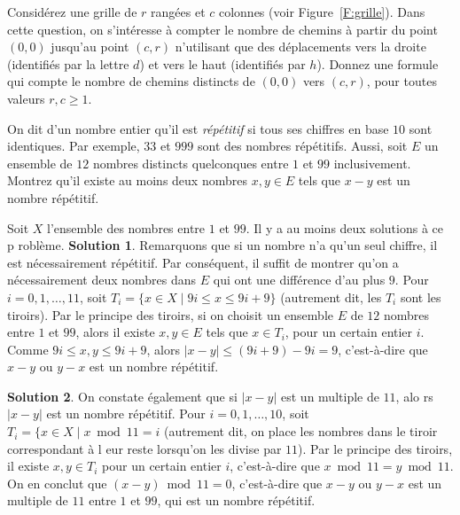 \documentclass[12pt,addpoints]{exam}
\begin{document}
\begin{questions}
\question
Considérez une grille de $r$ rangées et $c$ colonnes (voir Figure~\ref{F:grille}). Dans cette question, on s'intéresse à compter le nombre de chemins à partir du point $(0,0)$ jusqu'au point $(c,r)$ n'utilisant que des déplacements vers la droite (identifiés par la lettre $d$) et vers le haut (identifiés par $h$). Donnez une formule qui compte le nombre de chemins distincts de $(0,0)$ vers $(c,r)$, pour toutes valeurs $r,c \geq 1$.

\question
On dit d'un nombre entier qu'il est \emph{répétitif} si tous ses chiffres en base $10$ sont identiques. Par exemple, $33$ et $999$ sont des nombres répétitifs. Aussi, soit $E$ un ensemble de $12$ nombres distincts quelconques entre $1$ et $99$ inclusivement. Montrez qu'il existe au moins deux nombres $x,y \in E$ tels que $x - y$ est un nombre répétitif.
\begin{solution}
Soit $X$ l'ensemble des nombres entre $1$ et $99$. Il y a au moins deux solutions à ce p
roblème.
\textbf{Solution 1}. Remarquons que si un nombre n'a qu'un seul chiffre, il est nécessairement répétitif. Par conséquent, il suffit de montrer qu'on a nécessairement deux nombres dans $E$ qui ont une différence d'au plus $9$. Pour $i = 0,1,\ldots,11$, soit $T_i = \{x \in X \mid 9i \leq x \leq 9i+9\}$ (autrement dit, les $T_i$ sont les tiroirs). Par le principe des tiroirs, si on choisit un ensemble $E$ de $12$ nombres entre $1$ et $99$, alors il existe $x, y \in E$ tels que $x \in T_i$, pour un certain entier $i$. Comme $9i \leq x,y \leq 9i + 9$, alors $|x - y| \leq (9i + 9) - 9i = 9$, c'est-à-dire que $x - y$ ou $y - x$ est un nombre répétitif.

\textbf{Solution 2}. On constate également que si $|x - y|$ est un multiple de $11$, alo rs $|x - y|$ est un nombre répétitif. Pour $i = 0,1,\ldots,10$, soit $T_i = \{x \in X \mid x \bmod 11 = i$ (autrement dit, on place les nombres dans le tiroir correspondant à l eur reste lorsqu'on les divise par $11$). Par le principe des tiroirs, il existe $x,y \in T_i$ pour un certain entier $i$, c'est-à-dire que $x \bmod 11 = y \bmod 11$. On en conclut que $(x - y) \bmod 11 = 0$, c'est-à-dire que $x - y$ ou $y - x$ est un multiple de $11$ entre $1$ et $99$, qui est un nombre répétitif.
\end{solution}



\end{questions}
\end{document}
